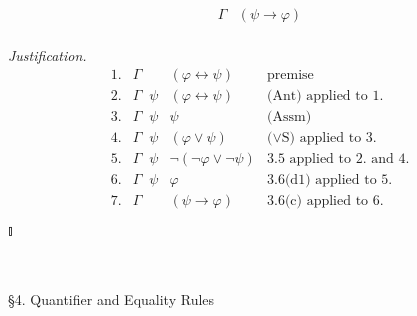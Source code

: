 \begin{enumerate}[1.]
\begin{enumerate}[(a)]
\[\begin{array}{ll}
\Gamma & (\psi \rightarrow \varphi)
\end{array}
\]
\\
\textit{Justification.}
\[
\begin{array}{llll}
1. & \Gamma & (\varphi \leftrightarrow \psi) & \mbox{premise} \\
2. & \Gamma \;\; \psi & (\varphi \leftrightarrow \psi) & \mbox{(Ant) applied to 1.} \\
3. & \Gamma \;\; \psi & \psi & \mbox{(Assm)} \\
4. & \Gamma \;\; \psi & (\varphi \lor \psi) & \mbox{($\lor$S) applied to 3.} \\
5. & \Gamma \;\; \psi & \neg (\neg \varphi \lor \neg \psi) & \mbox{3.5 applied to 2. and 4.} \\
6. & \Gamma \;\; \psi & \varphi & \mbox{3.6(d1) applied to 5.} \\
7. & \Gamma & (\psi \rightarrow \varphi) & \mbox{3.6(c) applied to 6.}
\end{array}
\]
\end{enumerate} \begin{flushright}$\talloblong$\end{flushright}
\end{enumerate}
\ 
\\
\\
{\large \S4. Quantifier and Equality Rules}
